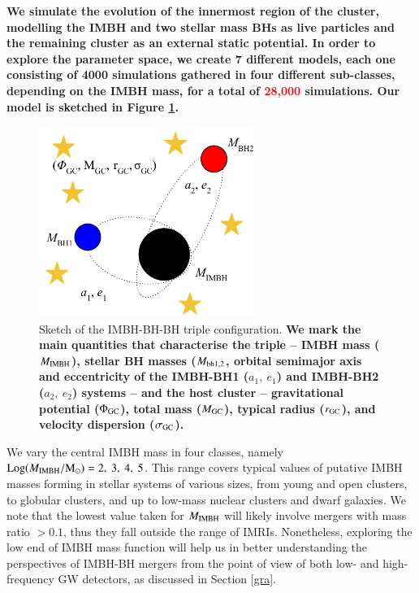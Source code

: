 \documentclass[article]{aa}
\newcommand{\Ms}{{\rm M}_\odot}
\newcommand{\gc}{{\rm GC}}
\newcommand{\ibh}{{\rm IMBH}}
\newcommand{\manuel}{\textcolor{red}}
\begin{document}
{\bf
We simulate the evolution of the innermost region of the cluster, modelling the IMBH and two stellar mass BHs as live particles and
the remaining cluster as an external static potential. In order to explore the parameter space, we create 7 different models, each one consisting of 4000 simulations gathered in four different sub-classes, depending on the IMBH mass, for a total of \manuel{28,000} simulations. Our model is sketched in Figure \ref{f1}. 

\begin{figure}
    \centering
    \includegraphics[width=7cm]{triple}
    \caption{Sketch of the IMBH-BH-BH triple configuration. {\bf We mark the main quantities that characterise the triple -- IMBH mass ($M_\ibh$), stellar BH masses ($M_{\rm bh 1,2}$, orbital semimajor axis and eccentricity of the IMBH-BH1 ($a_1,~e_1$) and IMBH-BH2 ($a_2,~e_2$) systems -- and the host cluster -- gravitational potential ($\Phi_\gc$), total mass ($M_\gc$), typical radius ($r_\gc$), and velocity dispersion ($\sigma_\gc$).} }    
\label{f1}
\end{figure}

We vary the central IMBH mass in four classes, namely ${\rm Log}(M_\ibh/\Ms) = 2,~3,~4,~5$. This range covers typical values of putative IMBH masses forming in stellar systems of various sizes, from young and open clusters, to globular clusters, and up to low-mass nuclear clusters and dwarf galaxies.
We note that the lowest value taken for $M_\ibh$ will likely involve mergers with mass ratio $> 0.1$, thus they fall outside the range of IMRIs. Nonetheless, exploring the low end of IMBH mass function will help us in better understanding the perspectives of IMBH-BH mergers from the point of view of both low- \citep[e.g.][]{Will04,seoane18} and high- \citep[e.g.][]{MandelEtAl2008,gair11,abbott17f} frequency GW detectors, as discussed in Section \ref{gra}.

}
\end{document}
